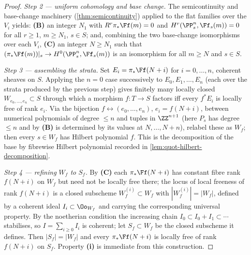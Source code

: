 \begin{proof}
  \emph{Step 2 — uniform cohomology and base change.} The semicontinuity and
  base-change machinery (\cref{thm:semicontinuity}) applied to the flat families
  over the \(V_i\) yields: \textbf{(B)} an integer \(N_1\) with
  \(R^r\pi_*\Ff(m)=0\) and \(H^r(\PP^n_s,\Ff_s(m))=0\) for all \(r\ge 1\),
  \(m\ge N_1\), \(s\in S\); and, combining the two base-change isomorphisms over
  each \(V_i\), \textbf{(C)} an integer \(N\ge N_1\) such that
  \((\pi_*\Ff(m))|_s\to H^0(\PP^n_s,\Ff_s(m))\) is an isomorphism for all
  \(m\ge N\) and \(s\in S\).

  \emph{Step 3 — assembling the strata.} Set \(E_i=\pi_*\Ff(N+i)\) for
  \(i=0,\dots,n\), coherent sheaves on \(S\). Applying the \(n=0\) case
  successively to \(E_0,E_1,\dots,E_n\) (each over the strata produced by the
  previous step) gives finitely many locally closed \(W_{e_0,\dots,e_n}\subset S\)
  through which a morphism \(f:T\to S\) factors iff every \(f^*E_i\) is locally
  free of rank \(e_i\). Via the bijection \(f\leftrightarrow(e_0,\dots,e_n)\),
  \(e_i=f(N+i)\), between numerical polynomials of degree \(\le n\) and tuples in
  \(\ZZ^{n+1}\) (here \(P_s\) has degree \(\le n\) and by \textbf{(B)} is
  determined by its values at \(N,\dots,N+n\)), relabel these as \(W_f\); then
  every \(s\in W_f\) has Hilbert polynomial \(f\). This is the decomposition of
  the base by fibrewise Hilbert polynomial recorded in
  \cref{lem:quot-hilbert-decomposition}.

  \emph{Step 4 — refining \(W_f\) to \(S_f\).} By \textbf{(C)} each
  \(\pi_*\Ff(N+i)\) has constant fibre rank \(f(N+i)\) on \(W_f\) but need not be
  locally free there; the locus of local freeness of rank \(f(N+i)\) is a closed
  subscheme \(W_f^{(i)}\subset W_f\) with \(|W_f^{(i)}|=|W_f|\), defined by a
  coherent ideal \(I_i\subset\Oo_{W_f}\) and carrying the corresponding universal
  property. By the noetherian condition the increasing chain
  \(I_0\subset I_0+I_1\subset\cdots\) stabilises, so \(I=\sum_{i\ge 0}I_i\) is
  coherent; let \(S_f\subset W_f\) be the closed subscheme it defines. Then
  \(|S_f|=|W_f|\) and every \(\pi_*\Ff(N+i)\) is locally free of rank \(f(N+i)\)
  on \(S_f\). Property \textbf{(i)} is immediate from this construction.


\end{proof}
